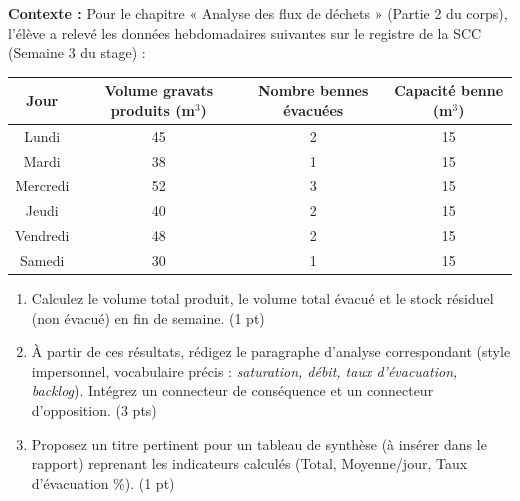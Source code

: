 \documentclass[11pt]{article}
\begin{document}
\begin{exercice}
    \textbf{Contexte :} Pour le chapitre « Analyse des flux de déchets » (Partie 2 du corps), l'élève a relevé les données hebdomadaires suivantes sur le registre de la SCC (Semaine 3 du stage) :
    
    \begin{center}
    \begin{tabular}{|c|c|c|c|}
    \hline
    \textbf{Jour} & \textbf{Volume gravats produits (m$^3$)} & \textbf{Nombre bennes évacuées} & \textbf{Capacité benne (m$^3$)} \\
    \hline
    Lundi & 45 & 2 & 15 \\
    Mardi & 38 & 1 & 15 \\
    Mercredi & 52 & 3 & 15 \\
    Jeudi & 40 & 2 & 15 \\
    Vendredi & 48 & 2 & 15 \\
    Samedi & 30 & 1 & 15 \\
    \hline
    \end{tabular}
    \end{center}
    
    \begin{enumerate}
        \item Calculez le volume total produit, le volume total évacué et le stock résiduel (non évacué) en fin de semaine. (1 pt)
        \item À partir de ces résultats, rédigez le paragraphe d'analyse correspondant (style impersonnel, vocabulaire précis : \textit{saturation, débit, taux d'évacuation, backlog}). Intégrez un connecteur de conséquence et un connecteur d'opposition. (3 pts)
        \item Proposez un titre pertinent pour un tableau de synthèse (à insérer dans le rapport) reprenant les indicateurs calculés (Total, Moyenne/jour, Taux d'évacuation \%). (1 pt)
    \end{enumerate}
\end{exercice}
\end{document}
